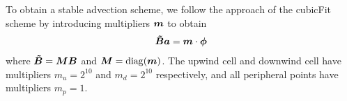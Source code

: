 To obtain a stable advection scheme, we follow the approach of the cubicFit scheme by introducing multipliers $\bm{m}$ to obtain
\begin{align}
	\bm{\tilde{B}} \bm{a} = \bm{m} \cdot \bm{\phi}
\end{align}
where $\bm{\tilde{B}} = \bm{M} \bm{B}$ and $\bm{M} = \mathrm{diag}(\bm{m})$.
The upwind cell and downwind cell have multipliers $m_u = 2^{10}$ and $m_d = 2^{10}$ respectively, and all peripheral points have multipliers $m_p = 1$.
